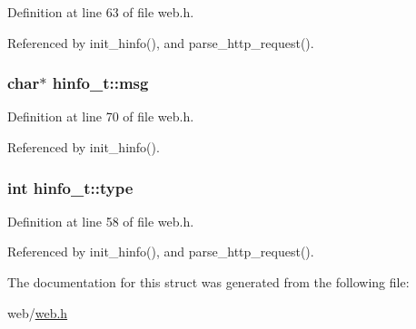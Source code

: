 Definition at line 63 of file web.\+h.



Referenced by init\+\_\+hinfo(), and parse\+\_\+http\+\_\+request().

\subsubsection[{\texorpdfstring{msg}{msg}}]{\setlength{\rightskip}{0pt plus 5cm}char$\ast$ hinfo\+\_\+t\+::msg}\hypertarget{structhinfo__t_a06469570091ad74724457998e07d5b56}{}\label{structhinfo__t_a06469570091ad74724457998e07d5b56}


Definition at line 70 of file web.\+h.



Referenced by init\+\_\+hinfo().

\subsubsection[{\texorpdfstring{type}{type}}]{\setlength{\rightskip}{0pt plus 5cm}int hinfo\+\_\+t\+::type}\hypertarget{structhinfo__t_a4e896141431943909a71282fc56799fb}{}\label{structhinfo__t_a4e896141431943909a71282fc56799fb}


Definition at line 58 of file web.\+h.



Referenced by init\+\_\+hinfo(), and parse\+\_\+http\+\_\+request().



The documentation for this struct was generated from the following file\+:\begin{DoxyCompactItemize}
\item 
web/\hyperlink{web_8h}{web.\+h}\end{DoxyCompactItemize}
